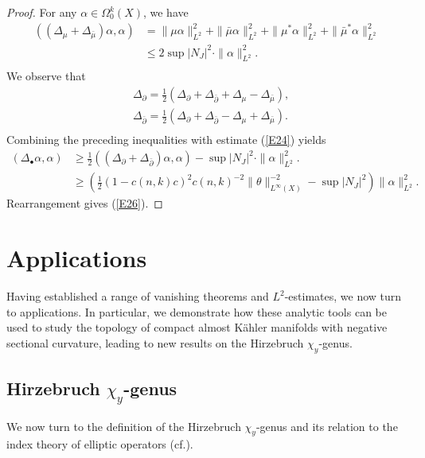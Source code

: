 \documentclass[12pt, twoside]{article}
\theoremstyle{definition}
\numberwithin{equation}{section}
\def \a {\alpha }
\def \De {\Delta}
\def\Om{\Omega}
\def\pa{\partial}
\begin{document}
	\begin{proof}
		For any  $\a\in\Om^{k}_{0}(X)$, we have
		\begin{equation*}
		\begin{split}
		((\De_{\mu}+\De_{\bar{\mu}})\a,\a)&=\|\mu\a\|_{L^2}^{2}+\|\bar{\mu}\a\|_{L^2}^2+\|\mu^{\ast}\a\|_{L^2}^{2}+\|\bar{\mu}^{\ast}\a\|^2_{L^2}\\
		&\leq 2\sup|N_{J}|^{2}\cdot\|\a\|_{L^2}^{2}.\\
		\end{split}
		\end{equation*}
		We observe that
		\begin{equation*}
		\begin{split}
		&\De_{\pa}=\frac{1}{2}(\De_{\pa}+\De_{\bar{\pa}}+\De_{\mu}-\De_{\bar{\mu}}),\\
		&\De_{\bar{\pa}}=\frac{1}{2}(\De_{\pa}+\De_{\bar{\pa}}-\De_{\mu}+\De_{\bar{\mu}}).\\
		\end{split}
		\end{equation*}
		Combining the preceding inequalities with estimate (\ref{E24}) yields
		\begin{equation*}
		\begin{split}
		(\De_{\bullet}\a,\a)&\geq\frac{1}{2}((\De_{\pa}+\De_{\bar{\pa}})\a,\a)-\sup|N_{J}|^{2}\cdot\|\a\|_{L^2}^{2}.\\
		&\geq(\frac{1}{2}(1-c(n,k)c)^{2}c(n,k)^{-2}\|\theta\|^{-2}_{L^{\infty}(X)}-\sup|N_{J}|^{2})\|\a\|_{L^2}^{2}.
		\end{split}
		\end{equation*} 
		Rearrangement gives (\ref{E26}).
	\end{proof}



	\section{Applications}
	Having established a range of vanishing theorems and $L^{2}$-estimates, we now turn to applications. In particular, we demonstrate how these analytic tools can be used to study the topology of compact almost Kähler manifolds with negative sectional curvature, leading to new results on the Hirzebruch $\chi_{y}$-genus.
	\subsection{Hirzebruch $\chi_{y}$-genus }
We now turn to the definition of the Hirzebruch $\chi_{y}$-genus and its relation to the index theory of elliptic operators (cf.\cite{Huy}).	
\end{document}
